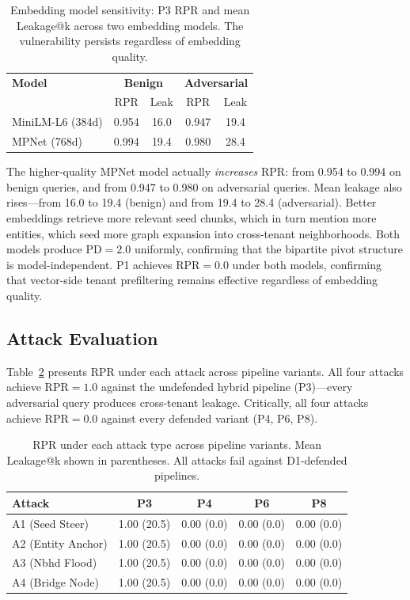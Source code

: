 \documentclass[letterpaper,twocolumn,10pt]{article}
\begin{document}
\begin{table}[t]
\centering
\caption{Embedding model sensitivity: P3 RPR and mean Leakage@k
  across two embedding models. The vulnerability persists regardless
  of embedding quality.}
\label{tab:embedding-sensitivity}
\small
\begin{tabular}{l|cc|cc}
\toprule
\textbf{Model} & \multicolumn{2}{c|}{\textbf{Benign}} &
  \multicolumn{2}{c}{\textbf{Adversarial}} \\
 & RPR & Leak & RPR & Leak \\
\midrule
  MiniLM-L6 (384d) & 0.954 & 16.0 & 0.947 & 19.4 \\
  MPNet (768d) & 0.994 & 19.4 & 0.980 & 28.4 \\
\bottomrule
\end{tabular}
\end{table}

The higher-quality MPNet model actually \emph{increases} RPR: from
0.954 to 0.994 on benign queries, and from 0.947 to 0.980 on
adversarial queries. Mean leakage also rises---from 16.0 to 19.4
(benign) and from 19.4 to 28.4 (adversarial). Better embeddings
retrieve more relevant seed chunks, which in turn mention more
entities, which seed more graph expansion into cross-tenant
neighborhoods. Both models produce $\text{PD} = 2.0$ uniformly,
confirming that the bipartite pivot structure is
model-independent. P1 achieves $\text{RPR} = 0.0$ under both
models, confirming that vector-side tenant prefiltering remains
effective regardless of embedding quality.

\subsection{Attack Evaluation}
\label{sec:attack-eval}

Table~\ref{tab:attack-heatmap} presents RPR under each attack across
pipeline variants. All four attacks achieve $\text{RPR} = 1.0$ against
the undefended hybrid pipeline (P3)---every adversarial query produces
cross-tenant leakage. Critically, all four attacks achieve
$\text{RPR} = 0.0$ against every defended variant (P4, P6, P8).

\begin{table}[t]
\centering
\caption{RPR under each attack type across pipeline variants.
  Mean Leakage@k shown in parentheses. All attacks fail against
  D1-defended pipelines.}
\label{tab:attack-heatmap}
\small
\begin{tabular}{l|cccc}
\toprule
\textbf{Attack} & \textbf{P3} & \textbf{P4} & \textbf{P6} &
  \textbf{P8} \\
\midrule
  A1 (Seed Steer) & 1.00 (20.5) & 0.00 (0.0) & 0.00 (0.0) &
    0.00 (0.0) \\
  A2 (Entity Anchor) & 1.00 (20.5) & 0.00 (0.0) & 0.00 (0.0) &
    0.00 (0.0) \\
  A3 (Nbhd Flood) & 1.00 (20.5) & 0.00 (0.0) & 0.00 (0.0) &
    0.00 (0.0) \\
  A4 (Bridge Node) & 1.00 (20.5) & 0.00 (0.0) & 0.00 (0.0) &
    0.00 (0.0) \\
\bottomrule
\end{tabular}
\end{table}
\end{document}
